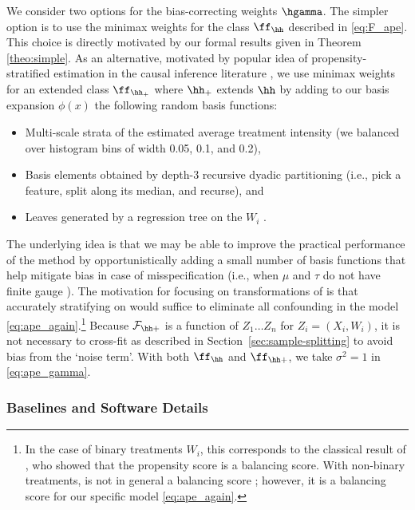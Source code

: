 \documentclass[aos,submission]{imsart}
\theoremstyle{plain}
\theoremstyle{remark}
\DeclarePairedDelimiter\norm{\lVert}{\rVert}
\newcommand{\F}{\mathcal{F}}
\begin{document}
We consider two options for the bias-correcting weights $\hgamma$. The simpler option is to use
the minimax weights for the class $\ff_{\hh}$ described in \eqref{eq:F_ape}.
This choice is directly motivated by our formal results given in Theorem \ref{theo:simple}.
As an alternative, motivated by popular idea of propensity-stratified estimation in the causal inference
literature \citep{rosenbaum1984reducing}, we use minimax weights for an extended class $\ff_{\hh_+}$
where $\hh_+$ extends $\hh$ by adding to our basis expansion $\phi(x)$ the following random basis functions:
\begin{itemize}
\item Multi-scale strata of the estimated average treatment intensity 
(we balanced over histogram bins of width 0.05, 0.1, and 0.2),
\item Basis elements obtained by depth-3 recursive dyadic partitioning (i.e., pick a feature, split along its median, and recurse), and
\item Leaves generated by a regression tree on the $W_i$ \citep{breiman1984classification}.
\end{itemize}
The underlying idea is that we may be able to improve the practical performance of the method by opportunistically adding
a small number of basis functions that help mitigate bias in case of misspecification (i.e., when $\mu$ and
$\tau$ do not have finite gauge \smash{$\norm{\cdot}_\hh$}). The motivation for focusing on transformations of
 is that accurately stratifying on  would
suffice to eliminate all confounding in the model \eqref{eq:ape_again}.\footnote{In the case of binary
treatments $W_i$, this corresponds to the classical result of \citet{rosenbaum1983central}, who showed
that the propensity score is a balancing score. With non-binary treatments, 
is not in general a balancing score \citep{imbens2000role}; however, it is 
a balancing score for our specific model \eqref{eq:ape_again}.} 
Because $\F_{\hh+}$ is a function of $Z_1 \ldots Z_n$ for $Z_i=(X_i,W_i)$,
it is not necessary to cross-fit as described in 
Section~\ref{sec:sample-splitting} to avoid bias from the `noise term'. 
With both $\ff_{\hh}$ and $\ff_{\hh+}$, we take $\sigma^2=1$ in \eqref{eq:ape_gamma}.

\subsubsection{Baselines and Software Details}
\end{document}
